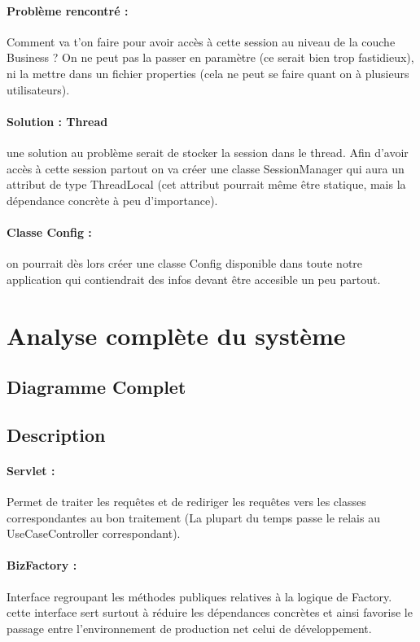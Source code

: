\documentclass{article}[12pt]
\begin{document}
\paragraph{Problème rencontré : } Comment va t'on faire pour avoir accès à cette session au niveau de la couche Business ? On ne peut pas la passer en paramètre (ce serait bien trop fastidieux), ni la mettre dans un fichier properties (cela ne peut se faire quant on à plusieurs utilisateurs).
\paragraph{Solution : Thread} une solution au problème serait de stocker la session dans le thread. Afin d'avoir accès à cette session partout on va créer une classe SessionManager qui aura un attribut de type ThreadLocal (cet attribut pourrait même être statique, mais la dépendance concrète à peu d'importance). 
\paragraph{Classe Config : } on pourrait dès lors créer une classe Config disponible dans toute notre application qui contiendrait des infos devant être accesible un peu partout. 
\newpage
\section{Analyse complète du système}
\subsection{Diagramme Complet}
\begin{landscape}[H]
    \centering
\end{landscape}
\subsection{Description}
\paragraph{Servlet : } Permet de traiter les requêtes et de rediriger les requêtes vers les classes correspondantes au bon traitement (La plupart du temps passe le relais au UseCaseController correspondant).
\paragraph{BizFactory : } Interface regroupant les méthodes publiques relatives à la logique de Factory. cette interface sert surtout à réduire les dépendances concrètes et ainsi favorise le passage entre l’environnement de production net celui de développement. 
\end{document}
